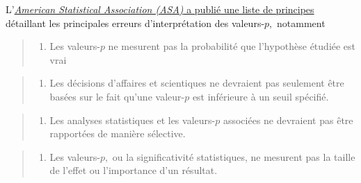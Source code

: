 \documentclass[
  11pt,
  letterpaper,
]{scrbook}
\providecommand{\tightlist}{%
  \setlength{\itemsep}{0pt}\setlength{\parskip}{0pt}}\usepackage{longtable,booktabs,array}
\theoremstyle{plain}
\theoremstyle{plain}
\theoremstyle{definition}
\theoremstyle{definition}
\theoremstyle{remark}
\begin{document}
\begin{tcolorbox}[enhanced jigsaw, breakable, colbacktitle=quarto-callout-caution-color!10!white, toprule=.15mm, leftrule=.75mm, colframe=quarto-callout-caution-color-frame, bottomtitle=1mm, left=2mm, coltitle=black, toptitle=1mm, titlerule=0mm, title=\textcolor{quarto-callout-caution-color}{\faFire}\hspace{0.5em}{Mise en garde}, arc=.35mm, opacitybacktitle=0.6, colback=white, rightrule=.15mm, bottomrule=.15mm, opacityback=0]

L'\href{https://doi.org/10.1080/00031305.2016.1154108}{\emph{American
Statistical Association (ASA)} a publié une liste de principes}
détaillant les principales erreurs d'interprétation des valeurs-\(p,\)
notamment

\begin{quote}
\begin{enumerate}
\def\labelenumi{(\arabic{enumi})}
\setcounter{enumi}{1}
\tightlist
\item
  Les valeurs-\(p\) ne mesurent pas la probabilité que l'hypothèse
  étudiée est vrai
\end{enumerate}
\end{quote}

\begin{quote}
\begin{enumerate}
\def\labelenumi{(\arabic{enumi})}
\setcounter{enumi}{2}
\tightlist
\item
  Les décisions d'affaires et scientiques ne devraient pas seulement
  être basées sur le fait qu'une valeur-\(p\) est inférieure à un seuil
  spécifié.
\end{enumerate}
\end{quote}

\begin{quote}
\begin{enumerate}
\def\labelenumi{(\arabic{enumi})}
\setcounter{enumi}{3}
\tightlist
\item
  Les analyses statistiques et les valeurs-\(p\) associées ne devraient
  pas être rapportées de manière sélective.
\end{enumerate}
\end{quote}

\begin{quote}
\begin{enumerate}
\def\labelenumi{(\arabic{enumi})}
\setcounter{enumi}{4}
\tightlist
\item
  Les valeurs-\(p,\) ou la significativité statistiques, ne mesurent pas
  la taille de l'effet ou l'importance d'un résultat.
\end{enumerate}
\end{quote}

\end{tcolorbox}
\end{document}
